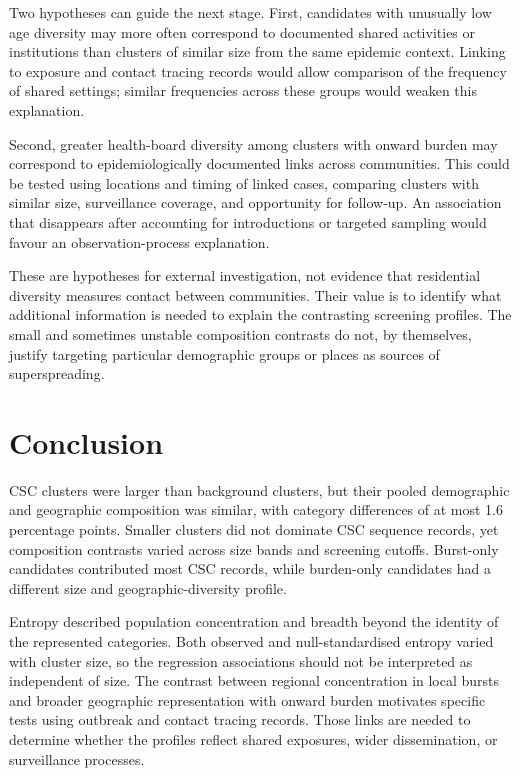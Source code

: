 Two hypotheses can guide the next stage. First, candidates with unusually low age diversity may more often correspond to documented shared activities or institutions than clusters of similar size from the same epidemic context. Linking to exposure and contact tracing records would allow comparison of the frequency of shared settings; similar frequencies across these groups would weaken this explanation.

Second, greater health-board diversity among clusters with onward burden may correspond to epidemiologically documented links across communities. This could be tested using locations and timing of linked cases, comparing clusters with similar size, surveillance coverage, and opportunity for follow-up. An association that disappears after accounting for introductions or targeted sampling would favour an observation-process explanation.

These are hypotheses for external investigation, not evidence that residential diversity measures contact between communities. Their value is to identify what additional information is needed to explain the contrasting screening profiles. The small and sometimes unstable composition contrasts do not, by themselves, justify targeting particular demographic groups or places as sources of superspreading.

\section{Conclusion}\label{sec:ch6_discussion_conclusions}

CSC clusters were larger than background clusters, but their pooled demographic and geographic composition was similar, with category differences of at most 1.6 percentage points. Smaller clusters did not dominate CSC sequence records, yet composition contrasts varied across size bands and screening cutoffs. Burst-only candidates contributed most CSC records, while burden-only candidates had a different size and geographic-diversity profile.

Entropy described population concentration and breadth beyond the identity of the represented categories. Both observed and null-standardised entropy varied with cluster size, so the regression associations should not be interpreted as independent of size. The contrast between regional concentration in local bursts and broader geographic representation with onward burden motivates specific tests using outbreak and contact tracing records. Those links are needed to determine whether the profiles reflect shared exposures, wider dissemination, or surveillance processes.
